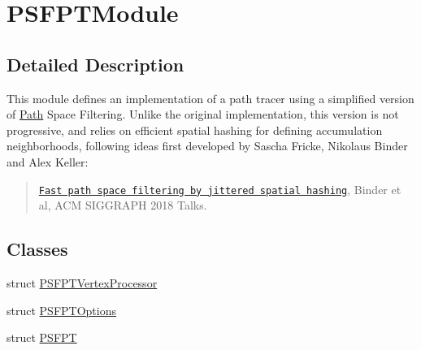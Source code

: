 \hypertarget{group___p_s_f_p_t_module}{}\section{P\+S\+F\+P\+T\+Module}
\label{group___p_s_f_p_t_module}


\subsection{Detailed Description}
This module defines an implementation of a path tracer using a simplified version of \hyperlink{struct_path}{Path} Space Filtering. Unlike the original implementation, this version is not progressive, and relies on efficient spatial hashing for defining accumulation neighborhoods, following ideas first developed by Sascha Fricke, Nikolaus Binder and Alex Keller\+:

\begin{quote}
\href{https://dl.acm.org/citation.cfm?id=3214806}{\tt Fast path space filtering by jittered spatial hashing}, Binder et al, A\+CM S\+I\+G\+G\+R\+A\+PH 2018 Talks.\end{quote}
\subsection*{Classes}
\begin{DoxyCompactItemize}
\item 
struct \hyperlink{struct_p_s_f_p_t_vertex_processor}{P\+S\+F\+P\+T\+Vertex\+Processor}
\item 
struct \hyperlink{struct_p_s_f_p_t_options}{P\+S\+F\+P\+T\+Options}
\item 
struct \hyperlink{struct_p_s_f_p_t}{P\+S\+F\+PT}
\end{DoxyCompactItemize}
